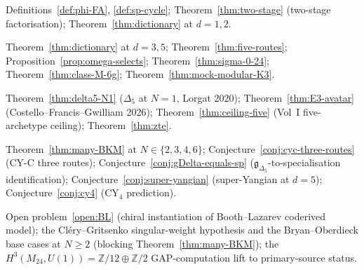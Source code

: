 \documentclass[11pt]{amsart}
\providecommand{\Z}{\mathbb{Z}}
\providecommand{\gDelta}{\mathfrak{g}_{\Delta_5}}
\providecommand{\Mtf}{M_{24}}
\providecommand{\ClaimStatusTheorem}{\textsc{[theorem]}}
\providecommand{\ClaimStatusDerivation}{\textsc{[derivation]}}
\providecommand{\ClaimStatusConjectured}{\textsc{[conjectured]}}
\providecommand{\ClaimStatusOpen}{\textsc{[open]}}
\theoremstyle{plain}
\theoremstyle{definition}
\theoremstyle{remark}
\begin{document}
\begin{description}[leftmargin=2em]
\item[\ClaimStatusTheorem] Definitions~\ref{def:phi-FA},
\ref{def:sp-cycle}; Theorem~\ref{thm:two-stage} (two-stage
factorisation); Theorem~\ref{thm:dictionary} at $d=1,2$.

\item[\ClaimStatusDerivation] Theorem~\ref{thm:dictionary} at $d=3,5$;
Theorem~\ref{thm:five-routes}; Proposition~\ref{prop:omega-selects};
Theorem~\ref{thm:sigma-0-24}; Theorem~\ref{thm:class-M-6g};
Theorem~\ref{thm:mock-modular-K3}.

\item[\ClaimStatusTheorem] Theorem~\ref{thm:delta5-N1} ($\Delta_5$ at
$N=1$, Lorgat 2020); Theorem~\ref{thm:E3-avatar}
(Costello--Francis--Gwilliam 2026); Theorem~\ref{thm:ceiling-five}
(Vol~I five-archetype ceiling); Theorem~\ref{thm:zte}.

\item[\ClaimStatusConjectured] Theorem~\ref{thm:many-BKM} at
$N\in\{2,3,4,6\}$; Conjecture~\ref{conj:cyc-three-routes}
(CY-C three routes); Conjecture~\ref{conj:gDelta-equals-sp}
($\gDelta$-to-specialisation identification);
Conjecture~\ref{conj:super-yangian} (super-Yangian at $d=5$);
Conjecture~\ref{conj:cy4} (CY$_4$ prediction).

\item[\ClaimStatusOpen] Open problem~\ref{open:BL} (chiral
instantiation of Booth--Lazarev coderived model); the
Cl\'ery--Gritsenko singular-weight hypothesis and the Bryan--Oberdieck
base cases at $N\geq 2$ (blocking Theorem~\ref{thm:many-BKM});
the $H^3(\Mtf,U(1))=\Z/12\oplus\Z/2$ GAP-computation lift to
primary-source status.
\end{description}
\end{document}
